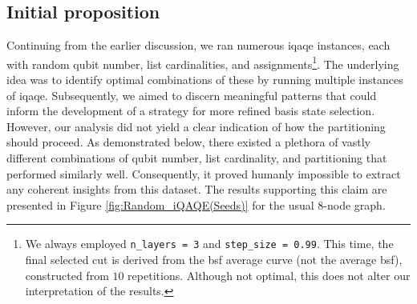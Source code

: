 \subsection*{Initial proposition}
Continuing from the earlier discussion, we ran numerous \acrshort{iqaqe} instances, each with random qubit number, list cardinalities, and assignments\footnote{We always employed \texttt{n\_layers = 3} and \texttt{step\_size = 0.99}. This time, the final selected cut is derived from the \acrshort{bsf} average curve (not the average \acrshort{bsf}), constructed from $10$ repetitions. Although not optimal, this does not alter our interpretation of the results.}. The underlying idea was to identify optimal combinations of these by running multiple instances of \acrshort{iqaqe}. Subsequently, we aimed to discern meaningful patterns that could inform the development of a strategy for more refined basis state selection. However, our analysis did not yield a clear indication of how the partitioning should proceed. As demonstrated below, there existed a plethora of vastly different combinations of qubit number, list cardinality, and partitioning that performed similarly well. Consequently, it proved humanly impossible to extract any coherent insights from this dataset. The results supporting this claim are presented in Figure \ref{fig:Random_iQAQE(Seeds)} for the usual $8$-node graph.

